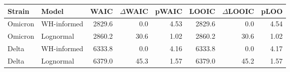 \begin{tabular}{llrrrrrr}
\hline
Strain & Model & WAIC & $\Delta$WAIC & pWAIC & LOOIC & $\Delta$LOOIC & pLOO \\
\hline
Omicron & WH-informed & 2829.6 & 0.0 & 4.53 & 2829.6 & 0.0 & 4.54 \\
Omicron & Lognormal & 2860.2 & 30.6 & 1.02 & 2860.2 & 30.6 & 1.02 \\
Delta & WH-informed & 6333.8 & 0.0 & 4.16 & 6333.8 & 0.0 & 4.17 \\
Delta & Lognormal & 6379.0 & 45.3 & 1.57 & 6379.0 & 45.2 & 1.57 \\
\hline
\end{tabular}
